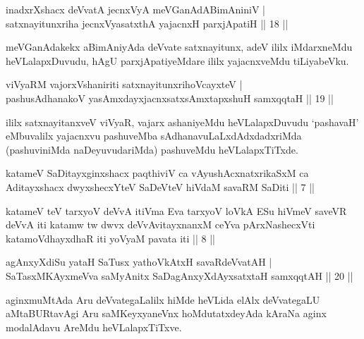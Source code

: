 
\begin{shl}
inadxrXshacx deVvatA jecnxVyA meVGanAdABimAniniV |\\
satxnayitunxriha jecnxVyasatxthA yajacnxH parxjApatiH \hfill || 18 ||
\end{shl}

\begin{artha}
meVGanAdakekx aBimAniyAda deVvate satxnayitunx, adeV ililx iMdarxneMdu heVLalapxDuvudu, hAgU parxjApatiyeMdare ililx yajacnxveMdu tiLiyabeVku.
\end{artha}


\begin{shl}
viVyaRM vajorxV\s shaniriti satxnayitunxrihoVcayxteV |\\
pashusAdhanakoV yasAmxdayxjacnxsatxsAmxtapxshuH samxqqtaH \hfill || 19 ||
\end{shl}

\begin{artha}
ililx satxnayitanxveV viVyaR, vajarx ashaniyeMdu heVLalapxDuvudu `pashavaH' \-eMbuvalilx yajacnxvu pashuveMba sAdhanavuLaLxdAdxdadxriMda (pashuviniMda naDeyuvu\-dariMda) pashuveMdu heVLalapxTiTxde.
\end{artha}

\begin{shl}
katameV SaDitayxginxshacx paqthiviV ca vAyushAcxnatxrikaSxM ca Aditayxshacx dwyxshecxYteV SaDeVteV hiVdaM savaRM SaDiti || 7 ||

katameV teV tarxyoV deVvA itiVma Eva tarxyoV loVkA ESu hiVmeV saveVR deVvA iti katamw tw dwvx deVvAvitayxnanxM ceYva pArxNashecxVti katamoV\s dhayxdhaR iti yoV\s yaM pavata iti || 8 ||
\end{shl}


\begin{shl}
agAnxyXdiSu yataH SaTusx yathoVkAtxH savaRdeVvatAH |\\
SaTasxMKAyxmeVva saMyAnitx SaDagAnxyXdAyxsatxtaH samxqqtAH \hfill || 20 ||
\end{shl}

\begin{artha}
aginxmuMtAda Aru deVvategaLalilx hiMde heVLida elAlx deVvategaLU aMta\-BURtavAgi Aru saMKeyxyaneVnx hoMdutatxdeyAda kAraNa aginx modalAdavu AreMdu heVLalapxTiTxve.
\end{artha}

